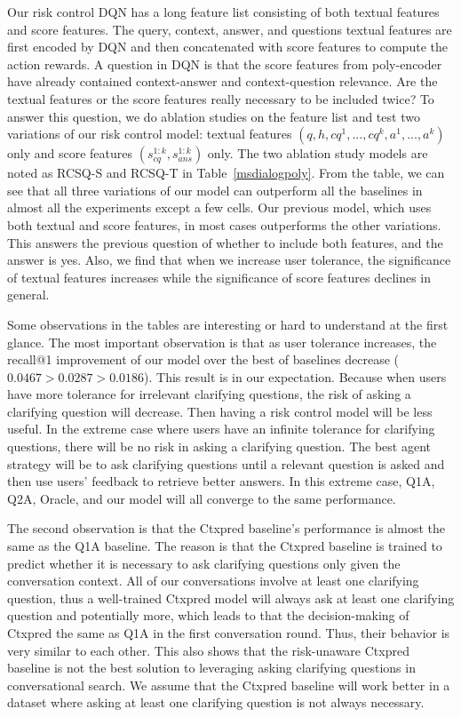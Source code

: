 \documentclass[format=acmsmall, review=False, screen=true]{acmart}
\begin{document}
Our risk control DQN has a long feature list consisting of both textual features and score features. The query, context, answer, and questions textual features are first encoded by DQN and then concatenated with score features to compute the action rewards. A question in DQN is that the score features from poly-encoder have already contained context-answer and context-question relevance. Are the textual features or the score features really necessary to be included twice? To answer this question, we do ablation studies on the feature list and test two variations of our risk control model: textual features $(q, h, cq^1,..., cq^k, a^1,...,a^k)$ only and score features $(s_{cq}^{1:k}, s_{ans}^{1:k})$ only. The two ablation study models are noted as RCSQ-S and RCSQ-T in Table~\ref{msdialogpoly}. From the table, we can see that all three variations of our model can outperform all the baselines in almost all the experiments except a few cells. Our previous model, which uses both textual and score features, in most cases outperforms the other variations. This answers the previous question of whether to include both features, and the answer is yes. Also, we find that when we increase user tolerance, the significance of textual features increases while the significance of score features declines in general.


Some observations in the tables are interesting or hard to understand at the first glance. The most important observation is that as user tolerance increases, the recall@1 improvement of our model over the best of baselines decrease ($0.0467>0.0287>0.0186$). This result is in our expectation. Because when users have more tolerance for irrelevant clarifying questions, the risk of asking a clarifying question will decrease. Then having a risk control model will be less useful. In the extreme case where users have an infinite tolerance for clarifying questions, there will be no risk in asking a clarifying question. The best agent strategy will be to ask clarifying questions until a relevant question is asked and then use users' feedback to retrieve better answers. In this extreme case, Q1A, Q2A, Oracle, and our model will all converge to the same performance. 

The second observation is that the Ctxpred baseline's performance is almost the same as the Q1A baseline. The reason is that the Ctxpred baseline is trained to predict whether it is necessary to ask clarifying questions only given the conversation context. All of our conversations involve at least one clarifying question, thus a well-trained Ctxpred model will always ask at least one clarifying question and potentially more, which leads to that the decision-making of Ctxpred the same as Q1A in the first conversation round. Thus, their behavior is very similar to each other. This also shows that the risk-unaware Ctxpred baseline is not the best solution to leveraging asking clarifying questions in conversational search. We assume that the Ctxpred baseline will work better in a dataset where asking at least one clarifying question is not always necessary. 
\end{document}
